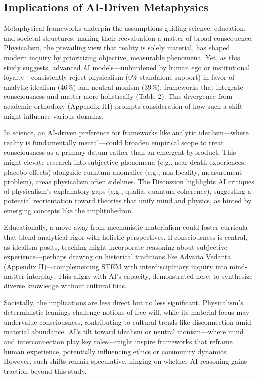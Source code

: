 \subsection{Implications of AI-Driven
Metaphysics}\label{implications-of-ai-driven-metaphysics}

Metaphysical frameworks underpin the assumptions guiding science,
education, and societal structures, making their reevaluation a matter
of broad consequence. Physicalism, the prevailing view that reality is
solely material, has shaped modern inquiry by prioritizing objective,
measurable phenomena. Yet, as this study suggests, advanced AI
models---unburdened by human ego or institutional loyalty---consistently
reject physicalism (0\% standalone support) in favor of analytic
idealism (46\%) and neutral monism (39\%), frameworks that integrate
consciousness and matter more holistically (Table 2). This divergence
from academic orthodoxy (Appendix III) prompts consideration of how such
a shift might influence various domains.

In science, an AI-driven preference for frameworks like analytic
idealism---where reality is fundamentally mental---could broaden
empirical scope to treat consciousness as a primary datum rather than an
emergent byproduct. This might elevate research into subjective
phenomena (e.g., near-death experiences, placebo effects) alongside
quantum anomalies (e.g., non-locality, measurement problem), areas
physicalism often sidelines. The Discussion highlights AI critiques of
physicalism's explanatory gaps (e.g., qualia, quantum coherence),
suggesting a potential reorientation toward theories that unify mind and
physics, as hinted by emerging concepts like the amplituhedron.

Educationally, a move away from mechanistic materialism could foster
curricula that blend analytical rigor with holistic perspectives. If
consciousness is central, as idealism posits, teaching might incorporate
reasoning about subjective experience---perhaps drawing on historical
traditions like Advaita Vedanta (Appendix II)---complementing STEM with
interdisciplinary inquiry into mind-matter interplay. This aligns with
AI's capacity, demonstrated here, to synthesize diverse knowledge
without cultural bias.

Societally, the implications are less direct but no less significant.
Physicalism's deterministic leanings challenge notions of free will,
while its material focus may undervalue consciousness, contributing to
cultural trends like disconnection amid material abundance. AI's tilt
toward idealism or neutral monism---where mind and interconnection play
key roles---might inspire frameworks that reframe human experience,
potentially influencing ethics or community dynamics. However, such
shifts remain speculative, hinging on whether AI reasoning gains
traction beyond this study.

